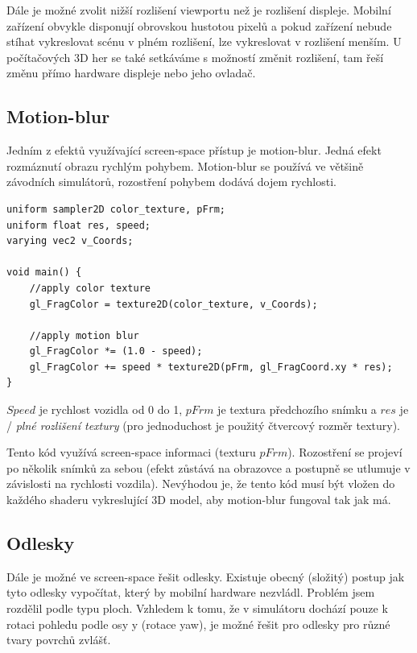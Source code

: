\documentclass[11pt,twoside,a4paper]{book}
\begin{document}
Dále je možné zvolit nižší rozlišení viewportu než je rozlišení displeje. Mobilní zařízení obvykle disponují obrovskou hustotou pixelů a pokud zařízení nebude stíhat vykreslovat scénu v plném rozlišení, lze vykreslovat v rozlišení menším. U počítačových 3D her se také setkáváme s možností změnit rozlišení, tam řeší změnu přímo hardware displeje nebo jeho ovladač.

\subsection{Motion-blur}
Jedním z efektů využívající screen-space přístup je motion-blur. Jedná efekt rozmáznutí obrazu rychlým pohybem. Motion-blur se používá ve většině závodních simulátorů, rozostření pohybem dodává dojem rychlosti.
\lstset{language=GLSL} 
\begin{lstlisting}[caption=Motion blur fragment shader dle rychlosti vozidla]
uniform sampler2D color_texture, pFrm;
uniform float res, speed;
varying vec2 v_Coords;

void main() {
	//apply color texture
	gl_FragColor = texture2D(color_texture, v_Coords); 

	//apply motion blur
	gl_FragColor *= (1.0 - speed);
	gl_FragColor += speed * texture2D(pFrm, gl_FragCoord.xy * res);
}
\end{lstlisting}

$Speed$ je rychlost vozidla od 0 do 1, $pFrm$ je textura předchozího snímku a $res$ je / \textit{plné rozlišení textury} (pro jednoduchost je použitý čtvercový rozměr textury).

Tento kód využívá screen-space informaci (texturu $pFrm$). Rozostření se projeví po několik snímků za sebou (efekt zůstává na obrazovce a postupně se utlumuje v závislosti na rychlosti vozdila). Nevýhodou je, že tento kód musí být vložen do každého shaderu vykreslující 3D model, aby motion-blur fungoval tak jak má.

\subsection{Odlesky}
Dále je možné ve screen-space řešit odlesky. Existuje obecný (složitý) postup jak tyto odlesky vypočítat, který by mobilní hardware nezvládl. Problém jsem rozdělil podle typu ploch. Vzhledem k tomu, že v simulátoru dochází pouze k rotaci pohledu podle osy y (rotace yaw), je možné řešit pro odlesky pro různé tvary povrchů zvlášť.
\end{document}
